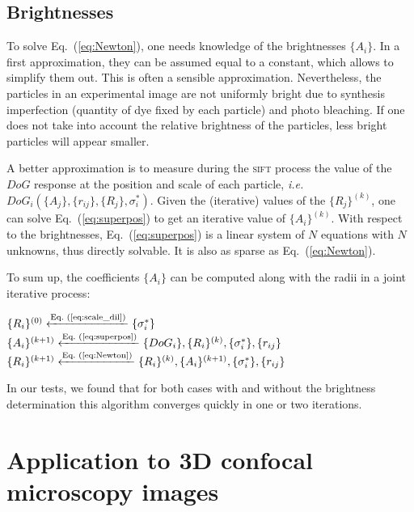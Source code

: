 \documentclass[8.5pt,twoside,twocolumn]{article}
\begin{document}
\subsection{Brightnesses}

To solve Eq.~(\ref{eq:Newton}), one needs knowledge of the brightnesses $\lbrace A_i\rbrace$. In a first approximation, they can be assumed equal to a constant, which allows to simplify them out. This is often a sensible approximation. Nevertheless, the particles in an experimental image are not uniformly bright due to synthesis imperfection (quantity of dye fixed by each particle) and photo bleaching. If one does not take into account the relative brightness of the particles, less bright particles will appear smaller.

A better approximation is to measure during the \textsc{sift} process the value of the $DoG$ response at the position and scale of each particle, \emph{i.e.} $DoG_i(\lbrace A_j\rbrace, \lbrace r_{ij}\rbrace, \lbrace R_j\rbrace, \sigma_i^*)$. Given the (iterative) values of the $\lbrace R_j\rbrace^{(k)}$, one can solve Eq.~(\ref{eq:superpos}) to get an iterative value of $\lbrace A_i\rbrace^{(k)}$. With respect to the brightnesses, Eq.~(\ref{eq:superpos}) is a linear system of $N$ equations with $N$ unknowns, thus directly solvable. It is also as sparse as Eq.~(\ref{eq:Newton}).

To sum up, the coefficients $\lbrace A_i\rbrace$ can be computed along with the radii in a joint iterative process:
\begin{algorithmic}
\State $\lbrace R_i\rbrace^{(0)} \xleftarrow{\text{Eq.~(\ref{eq:scale_dil})}} \lbrace \sigma_i^*\rbrace$
\Repeat 
	\State $\lbrace A_i\rbrace^{(k+1)} \xleftarrow{\text{Eq.~(\ref{eq:superpos})}} \lbrace DoG_i \rbrace, \lbrace R_i\rbrace^{(k)}, \lbrace \sigma_i^*\rbrace, \lbrace r_{ij}\rbrace$
	\State $\lbrace R_i\rbrace^{(k+1)} \xleftarrow{\text{Eq.~(\ref{eq:Newton})}} \lbrace R_i\rbrace^{(k)}, \lbrace A_i\rbrace^{(k+1)}, \lbrace \sigma_i^*\rbrace, \lbrace r_{ij}\rbrace$ 
\end{algorithmic}

In our tests, we found that for both cases with and without the brightness determination this algorithm converges quickly in one or two iterations.

\section{Application to 3D confocal microscopy images}
\label{sec:confocal}
\end{document}

